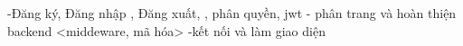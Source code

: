 -Đăng ký, Đăng nhập , Đăng xuất, , phân quyền, jwt
- phân trang và hoàn thiện backend <middeware, mã hóa>
-kết nối và làm giao diện